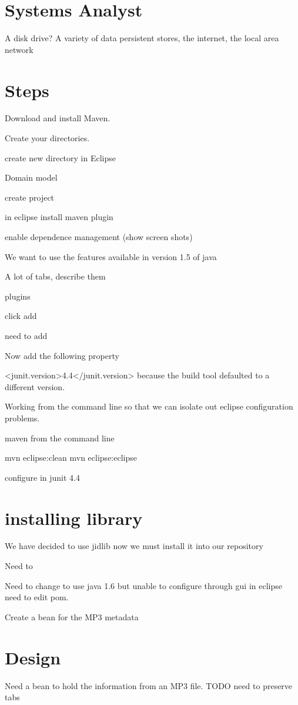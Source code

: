 \documentclass[a4paper,10pt]{book}
\begin{document}
\section{Systems Analyst}
A disk drive?  A variety of data persistent stores, the internet, the local area network
\section{Steps}
Download and install Maven.

Create your directories.

create new directory in Eclipse

Domain model

create project 

in eclipse install maven plugin

enable dependence management (show screen shots)

We want to use the features available in version 1.5 of java

A lot of tabs, describe them



plugins

click add

need to add 

Now add the following property

    <junit.version>4.4</junit.version>
because the build tool defaulted to a different version.

Working from the command line so that we can isolate out eclipse configuration problems.

maven from the command line

mvn eclipse:clean
mvn eclipse:eclipse

configure in junit 4.4

\section{installing library}
We have decided to use jidlib now we must install it into our repository

Need to


Need to change to use java 1.6 but unable to configure through gui in eclipse need to edit pom.

Create a bean for the MP3 metadata 

\section{Design}
Need a bean to hold the information from an MP3 file.
TODO need to preserve tabs
\end{document}
